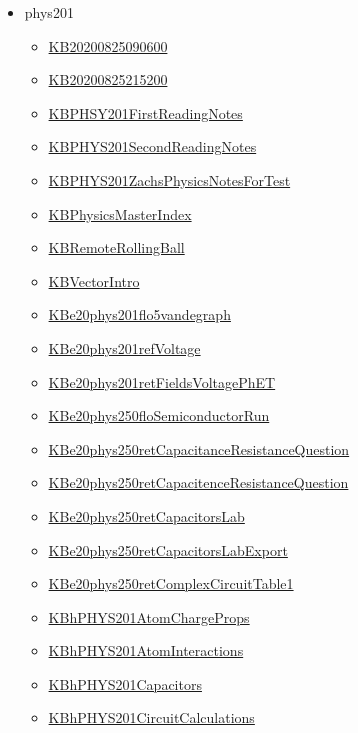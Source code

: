 \documentclass[11pt]{article}
\begin{document}
\begin{itemize}
\item phys201
\begin{itemize}
\item \href{phys201/KB20200825090600.org}{KB20200825090600}
\item \href{phys201/KB20200825215200.org}{KB20200825215200}
\item \href{phys201/KBPHSY201FirstReadingNotes.org}{KBPHSY201FirstReadingNotes}
\item \href{phys201/KBPHYS201SecondReadingNotes.org}{KBPHYS201SecondReadingNotes}
\item \href{phys201/KBPHYS201ZachsPhysicsNotesForTest.org}{KBPHYS201ZachsPhysicsNotesForTest}
\item \href{phys201/KBPhysicsMasterIndex.org}{KBPhysicsMasterIndex}
\item \href{phys201/KBRemoteRollingBall.org}{KBRemoteRollingBall}
\item \href{phys201/KBVectorIntro.org}{KBVectorIntro}
\item \href{phys201/KBe20phys201flo5vandegraph.org}{KBe20phys201flo5vandegraph}
\item \href{phys201/KBe20phys201refVoltage.org}{KBe20phys201refVoltage}
\item \href{phys201/KBe20phys201retFieldsVoltagePhET.org}{KBe20phys201retFieldsVoltagePhET}
\item \href{phys201/KBe20phys250floSemiconductorRun.org}{KBe20phys250floSemiconductorRun}
\item \href{phys201/KBe20phys250retCapacitanceResistanceQuestion.org}{KBe20phys250retCapacitanceResistanceQuestion}
\item \href{phys201/KBe20phys250retCapacitenceResistanceQuestion.org}{KBe20phys250retCapacitenceResistanceQuestion}
\item \href{phys201/KBe20phys250retCapacitorsLab.org}{KBe20phys250retCapacitorsLab}
\item \href{phys201/KBe20phys250retCapacitorsLabExport.org}{KBe20phys250retCapacitorsLabExport}
\item \href{phys201/KBe20phys250retComplexCircuitTable1.org}{KBe20phys250retComplexCircuitTable1}
\item \href{phys201/KBhPHYS201AtomChargeProps.org}{KBhPHYS201AtomChargeProps}
\item \href{phys201/KBhPHYS201AtomInteractions.org}{KBhPHYS201AtomInteractions}
\item \href{phys201/KBhPHYS201Capacitors.org}{KBhPHYS201Capacitors}
\item \href{phys201/KBhPHYS201CircuitCalculations.org}{KBhPHYS201CircuitCalculations}

\end{itemize}
\end{itemize}
\end{document}
